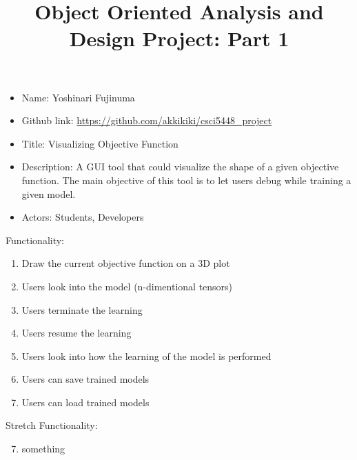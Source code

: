 \documentclass[11pt]{article}
\begin{document}
\vspace{-1cm}
\title{\vspace{-2ex} Object Oriented Analysis and Design Project: Part 1\vspace{-2ex}}
\date{\vspace{-6ex}}
\maketitle

\begin{itemize}
 \item Name: Yoshinari Fujinuma
 \item Github link: \url{https://github.com/akkikiki/csci5448_project}
 \item Title: Visualizing Objective Function
 \item Description: A GUI tool that could visualize the shape of a given objective function. The main objective of this tool is to let users debug while training a given model. 
 \item Actors: Students, Developers 
\end{itemize}

Functionality:
\begin{enumerate}[leftmargin=4\parindent]
 \item Draw the current objective function on a 3D plot
 \item Users look into the model (n-dimentional tensors)
 \item Users terminate the learning
 \item Users resume the learning
 \item Users look into how the learning of the model is performed
 \item Users can save trained models
 \item Users can load trained models
\end{enumerate}

Stretch Functionality:
\begin{enumerate}
 \setcounter{enumi}{6}
 \item something
\end{enumerate}
\end{document}
